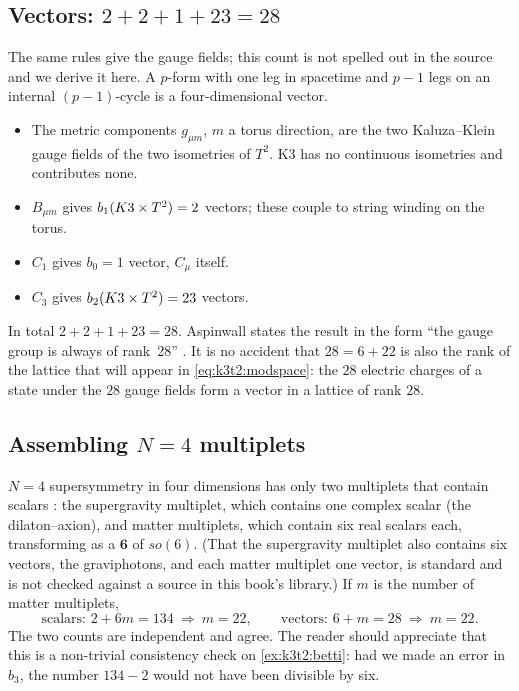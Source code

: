 \subsection{Vectors: \texorpdfstring{$2+2+1+23=28$}{28}}
The same rules give the gauge fields; this count is not spelled out in the source and we
derive it here. A $p$-form with one leg in spacetime and $p-1$ legs on an internal
$(p-1)$-cycle is a four-dimensional vector.
\begin{itemize}[leftmargin=*]
 \item The metric components $g_{\mu m}$, $m$ a torus direction, are the two Kaluza--Klein
 gauge fields of the two isometries of $T^2$. K3 has no continuous isometries and
 contributes none.
 \item $B_{\mu m}$ gives $b_1(K3\times T^2)=2$ vectors; these couple to string winding on the torus.
 \item $C_1$ gives $b_0=1$ vector, $C_\mu$ itself.
 \item $C_3$ gives $b_2(K3\times T^2)=23$ vectors.
\end{itemize}
In total $2+2+1+23=28$. Aspinwall states the result in the form ``the gauge group is always
of rank~28'' . It is no accident that
$28=6+22$ is also the rank of the lattice that will appear in \eqref{eq:k3t2:modspace}: the
$28$ electric charges of a state under the $28$ gauge fields form a vector in a lattice of
rank $28$.

\subsection{Assembling \texorpdfstring{$N=4$}{N=4} multiplets}
$N=4$ supersymmetry in four dimensions has only two multiplets that contain scalars
: the supergravity multiplet, which contains one complex
scalar (the dilaton--axion), and matter multiplets, which contain six real scalars each,
transforming as a $\mathbf 6$ of $so(6)$. (That the supergravity multiplet also contains six
vectors, the graviphotons, and each matter multiplet one vector, is standard and is not
checked against a source in this book's library.) If $m$ is the number of matter multiplets,
\begin{equation}\label{eq:k3t2:m22}
 \text{scalars: } 2+6m=134\ \Longrightarrow\ m=22,\qquad
 \text{vectors: } 6+m=28\ \Longrightarrow\ m=22 .
\end{equation}
The two counts are independent and agree. The reader should appreciate that this is a
non-trivial consistency check on \cref{ex:k3t2:betti}: had we made an error in $b_3$, the
number $134-2$ would not have been divisible by six.

